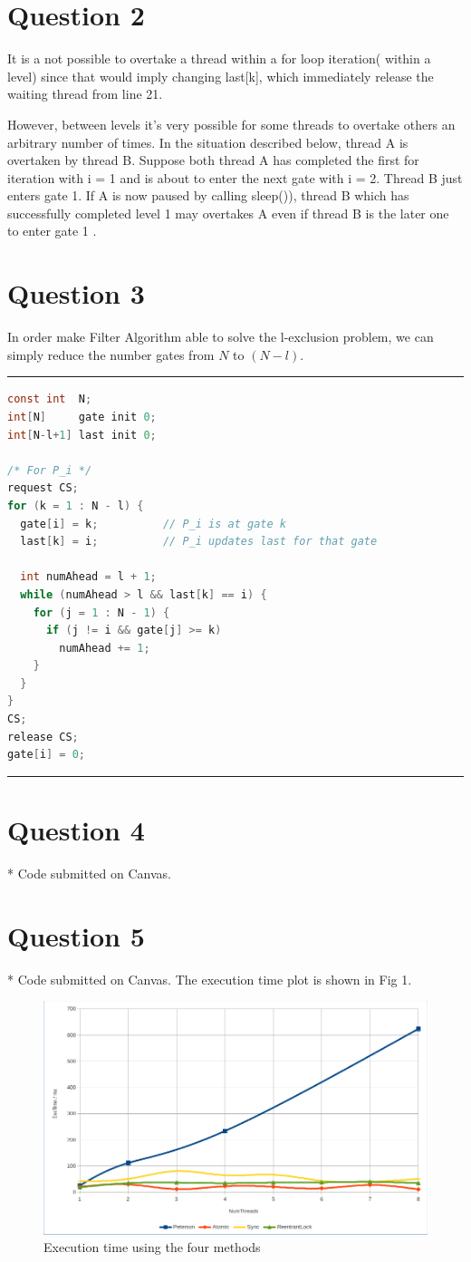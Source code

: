 \documentclass[12pt]{article}
\begin{document}
\section*{Question 2}
It is a not possible to overtake a thread within a for loop iteration( within a level) since that would imply changing last[k], which immediately release the waiting thread from line 21.  

However, between levels it's very possible for some threads to overtake others an arbitrary number of times. In the situation described below, thread A is overtaken by thread B. Suppose both thread A has completed the first for iteration with i = 1 and is about to enter the next gate with i = 2. Thread B just enters gate 1. If A is now paused by calling sleep()), thread B which has successfully completed level 1 may overtakes A  even if thread B is the later one to enter gate 1 . 

\section*{Question 3} 
In order make Filter Algorithm able to solve the l-exclusion problem, we can simply reduce the number gates from $N$ to $(N - l)$. \\
\noindent\rule[0.5ex]{\linewidth}{1pt}
\begin{lstlisting}[language=C] 
const int  N;           
int[N]     gate init 0; 
int[N-l+1] last init 0; 

/* For P_i */ 
request CS; 
for (k = 1 : N - l) { 
  gate[i] = k;          // P_i is at gate k 
  last[k] = i;          // P_i updates last for that gate 
	
  int numAhead = l + 1;   
  while (numAhead > l && last[k] == i) {
    for (j = 1 : N - 1) {
	  if (j != i && gate[j] >= k) 
	    numAhead += 1; 
    }
  }
}
CS; 
release CS; 
gate[i] = 0; 
\end{lstlisting}
\noindent\rule[0.5ex]{\linewidth}{1pt}

\section*{Question 4} 
* Code submitted on Canvas. 

\section*{Question 5}  
* Code submitted on Canvas. The execution time plot is shown in Fig 1. 
\begin{figure} 
	 \includegraphics[width=\linewidth]{plot.png}
	 \caption{Execution time using the four methods}
\end{figure} 
\end{document}
